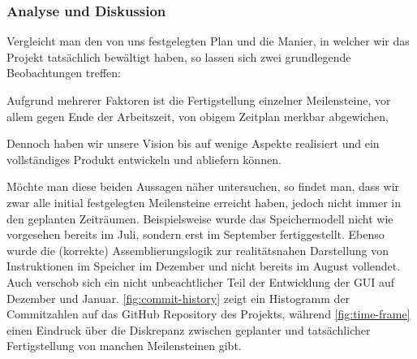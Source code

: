 
\subsubsection{Analyse und Diskussion}
\label{team:orga-plan-anal}
\vspace{-0.2cm}

Vergleicht man den von uns festgelegten Plan und die Manier, in welcher wir das
Projekt tatsächlich bewältigt haben, so lassen sich zwei grundlegende
Beobachtungen treffen:
\begin{senumerate}{-0.4cm}
  \item Aufgrund mehrerer Faktoren ist die Fertigstellung einzelner Meilensteine, vor allem gegen Ende der Arbeitszeit, von obigem Zeitplan merkbar abgewichen,
  \item Dennoch haben wir unsere Vision bis auf wenige Aspekte realisiert und ein vollständiges Produkt entwickeln und abliefern können.
  \vspace{-0.4cm}
\end{senumerate}

Möchte man diese beiden Aussagen näher untersuchen, so findet man, dass wir zwar
alle initial festgelegten Meilensteine erreicht haben, jedoch nicht immer in den
geplanten Zeiträumen. Beispielsweise wurde das Speichermodell nicht wie
vorgesehen bereits im Juli, sondern erst im September fertiggestellt. Ebenso
wurde die (korrekte) Assemblierungslogik zur realitätsnahen Darstellung von
Instruktionen im Speicher im Dezember und nicht bereits im August vollendet.
Auch verschob sich ein nicht unbeachtlicher Teil der Entwicklung der GUI auf
Dezember und Januar. \autoref{fig:commit-history} zeigt ein Histogramm der
Commitzahlen auf das GitHub Repository des Projekts, während
\autoref{fig:time-frame} einen Eindruck über die Diskrepanz zwischen geplanter
und tatsächlicher Fertigstellung von manchen Meilensteinen gibt.

